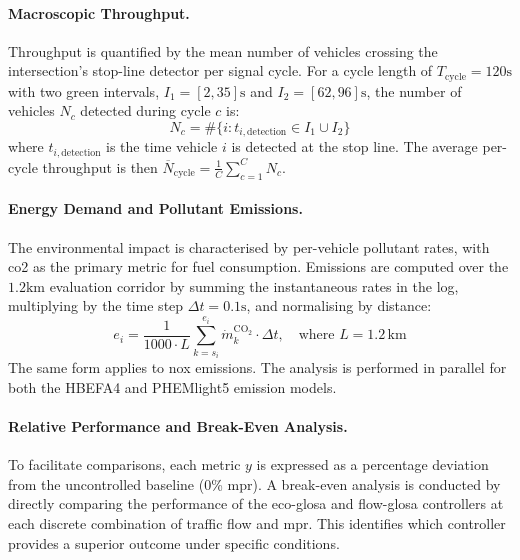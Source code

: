 \paragraph{Macroscopic Throughput.}
Throughput is quantified by the mean number of vehicles crossing the intersection's stop-line detector per signal cycle. For a cycle length of $T_{\mathrm{cycle}}=120\unit{\second}$ with two green intervals, $I_{1}=[2,35]\unit{\second}$ and $I_{2}=[62,96]\unit{\second}$, the number of vehicles $N_{c}$ detected during cycle $c$ is:
\begin{equation}
    N_{c} = \#\lbrace i : t_{i,\mathrm{detection}} \in I_{1} \cup I_{2} \rbrace
\end{equation}
where $t_{i,\mathrm{detection}}$ is the time vehicle $i$ is detected at the stop line. The average per-cycle throughput is then $\overline{N}_{\mathrm{cycle}} = \frac{1}{C}\sum_{c=1}^{C} N_{c}$.

\paragraph{Energy Demand and Pollutant Emissions.}
The environmental impact is characterised by per-vehicle pollutant rates, with \ac{co2} as the primary metric for fuel consumption. Emissions are computed over the $1.2\unit{\kilo\metre}$ evaluation corridor by summing the instantaneous rates in the log, multiplying by the time step $\Delta t = 0.1\unit{\second}$, and normalising by distance:
\begin{equation}
    e_{i} = \frac{1}{1000 \cdot L} \sum_{k=s_i}^{e_i} \dot{m}^{\mathrm{CO_2}}_{k} \cdot \Delta t, \quad \text{where } L = 1.2\,\mathrm{km}
\end{equation}
The same form applies to \ac{nox} emissions. The analysis is performed in parallel for both the HBEFA4 and PHEMlight5 emission models.

\paragraph{Relative Performance and Break-Even Analysis.}
To facilitate comparisons, each metric $y$ is expressed as a percentage deviation from the uncontrolled baseline (0\% \ac{mpr}). A break-even analysis is conducted by directly comparing the performance of the \ac{eco-glosa} and \ac{flow-glosa} controllers at each discrete combination of traffic flow and \ac{mpr}. This identifies which controller provides a superior outcome under specific conditions.

